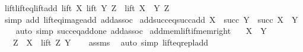 \begin{isabellebody}
\isanewline
{}\isamarkupfalse%
%
\endisatagproof
{\isafoldproof}%
%
\isadelimproof
\isanewline
%
\endisadelimproof
\isanewline
{}\isamarkupfalse%
\ lift{\isacharunderscore}{\kern0pt}lift{\isacharunderscore}{\kern0pt}eq{\isacharunderscore}{\kern0pt}lift{\isacharunderscore}{\kern0pt}add{\isacharcolon}{\kern0pt}\ {\isachardoublequoteopen}lift\ X\ {\isacharparenleft}{\kern0pt}lift\ Y\ Z{\isacharparenright}{\kern0pt}\ {\isacharequal}{\kern0pt}\ lift\ {\isacharparenleft}{\kern0pt}X\ {\isacharplus}{\kern0pt}\ Y{\isacharparenright}{\kern0pt}\ Z{\isachardoublequoteclose}\isanewline
%
\isadelimproof
\ \ %
\endisadelimproof
%
\isatagproof
{}\isamarkupfalse%
\ {\isacharparenleft}{\kern0pt}simp\ add{\isacharcolon}{\kern0pt}\ lift{\isacharunderscore}{\kern0pt}eq{\isacharunderscore}{\kern0pt}image{\isacharunderscore}{\kern0pt}add\ add{\isacharunderscore}{\kern0pt}assoc{\isacharparenright}{\kern0pt}%
\endisatagproof
{\isafoldproof}%
%
\isadelimproof
\isanewline
%
\endisadelimproof
\isanewline
{}\isamarkupfalse%
\ add{\isacharunderscore}{\kern0pt}succ{\isacharunderscore}{\kern0pt}eq{\isacharunderscore}{\kern0pt}succ{\isacharunderscore}{\kern0pt}add{\isacharcolon}{\kern0pt}\ {\isachardoublequoteopen}X\ {\isacharplus}{\kern0pt}\ succ\ Y\ {\isacharequal}{\kern0pt}\ succ\ {\isacharparenleft}{\kern0pt}X\ {\isacharplus}{\kern0pt}\ Y{\isacharparenright}{\kern0pt}{\isachardoublequoteclose}\isanewline
%
\isadelimproof
\ \ %
\endisadelimproof
%
\isatagproof
{}\isamarkupfalse%
\ {\isacharparenleft}{\kern0pt}auto\ simp{\isacharcolon}{\kern0pt}\ succ{\isacharunderscore}{\kern0pt}eq{\isacharunderscore}{\kern0pt}add{\isacharunderscore}{\kern0pt}one\ add{\isacharunderscore}{\kern0pt}assoc{\isacharparenright}{\kern0pt}%
\endisatagproof
{\isafoldproof}%
%
\isadelimproof
\isanewline
%
\endisadelimproof
\isanewline
{}\isamarkupfalse%
\ add{\isacharunderscore}{\kern0pt}mem{\isacharunderscore}{\kern0pt}lift{\isacharunderscore}{\kern0pt}if{\isacharunderscore}{\kern0pt}mem{\isacharunderscore}{\kern0pt}right{\isacharcolon}{\kern0pt}\isanewline
\ \ \ {\isachardoublequoteopen}X\ {\isasymin}\ Y{\isachardoublequoteclose}\isanewline
\ \ \ {\isachardoublequoteopen}Z\ {\isacharplus}{\kern0pt}\ X\ {\isasymin}\ lift\ Z\ Y{\isachardoublequoteclose}\isanewline
%
\isadelimproof
\ \ %
\endisadelimproof
%
\isatagproof
{}\isamarkupfalse%
\ assms\ \isamarkupfalse%
\ {\isacharparenleft}{\kern0pt}auto\ simp{\isacharcolon}{\kern0pt}\ lift{\isacharunderscore}{\kern0pt}eq{\isacharunderscore}{\kern0pt}repl{\isacharunderscore}{\kern0pt}add{\isacharparenright}{\kern0pt}%

\end{isabellebody}
